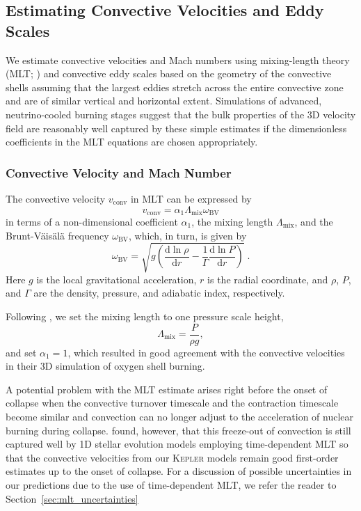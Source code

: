 \documentclass[useAMS,usenatbib]{mnras}
\newcommand{\ud}{\ensuremath{\mathrm{d}}}
\begin{document}
\subsection{Estimating Convective Velocities and Eddy Scales}
We estimate convective velocities and Mach numbers using mixing-length
theory
(MLT; \citealp{biermann_32,boehm_58}) and convective eddy scales based on the
geometry of the convective shells assuming that the largest eddies
stretch across the entire convective zone and are of similar vertical
and horizontal extent. Simulations of advanced, neutrino-cooled
burning stages \citep{kuhlen_03,arnett_09,mueller_16c,jones_17}
suggest that the bulk properties of the 3D velocity field are reasonably
well captured by these simple estimates if the dimensionless
coefficients in the MLT equations are chosen appropriately.

\subsubsection{Convective Velocity and Mach Number}
The convective velocity $v_\mathrm{conv}$ in MLT can be expressed by
\begin{equation}
  \nonumber
\label{eq:vconv}
v_\mathrm{conv}
=
\alpha_1 \Lambda_\mathrm{mix} \omega_\mathrm{BV}
\end{equation}
in terms of a non-dimensional coefficient $\alpha_1$,
the mixing length $\Lambda_\mathrm{mix}$, and the
Brunt-V\"ais\"al\"a frequency $\omega_\mathrm{BV}$,
which, in turn, is given by
\begin{equation}
\omega_\mathrm{BV}=\sqrt{g \left(\frac{\ud \ln \rho}{\ud r}- \frac{1}{\Gamma}\frac{\ud \ln P}{\ud r }\right)}\;.
\end{equation}
Here $g$ is the local gravitational acceleration, $r$ is the radial coordinate, and $\rho$,
$P$, and $\Gamma$ are the density, pressure, and adiabatic index, respectively.

Following \citet{mueller_16c}, we set the mixing length
to one pressure scale height,
\begin{equation}
\Lambda_\mathrm{mix}=\frac{P}{\rho g},
\end{equation}
and set $\alpha_1=1$, which resulted in good agreement with the
convective velocities in their 3D simulation of oxygen shell burning.

A potential problem with the MLT estimate arises right before the
onset of collapse when the convective turnover timescale and the
contraction timescale become similar and convection can no longer
adjust to the acceleration of nuclear burning during collapse.
\citet{mueller_16c} found, however,
that this freeze-out of convection is still captured well by
1D stellar evolution models employing time-dependent MLT so that
the convective velocities from our \textsc{Kepler} models
remain good first-order estimates up to the onset of collapse. For a discussion of possible uncertainties
in our predictions due to the use of time-dependent MLT,
we refer the reader to Section~\ref{sec:mlt_uncertainties}
\end{document}
